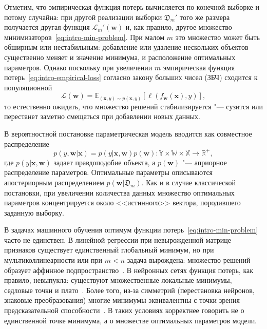 Отметим, что эмпирическая функция потерь вычисляется по конечной выборке и потому случайна: при другой реализации выборки $\mathfrak{D}_m'$ того же размера получается другая функция $\mathcal{L}_m'(\mathbf{w})$ и, как правило, другое множество минимизаторов~\eqref{eq:intro-min-problem}. При малом $m$ это множество может быть обширным или нестабильным: добавление или удаление нескольких объектов существенно меняет и значение минимума, и расположение оптимальных параметров. Однако поскольку при увеличении $m$ эмпирическая функция потерь~\eqref{eq:intro-empirical-loss} согласно закону больших чисел (ЗБЧ) сходится к популяционной
\begin{equation}
    \label{eq:intro-theoretical-loss}
    \mathcal{L}(\mathbf{w}) = \mathbb{E}_{(\mathbf{x}, y) \sim p(\mathbf{x}, y)}[\ell(f_{\mathbf{w}}(\mathbf{x}), y)],
\end{equation}
то естественно ожидать, что множество решений стабилизируется "--- сузится или перестанет заметно смещаться при добавлении новых данных.

В вероятностной постановке параметрическая модель вводится как совместное распределение
\begin{equation}
    \label{eq:intro-probability-problem}
    p(y, \mathbf{w} | \mathbf{x}) = p(y | \mathbf{x}, \mathbf{w}) p(\mathbf{w}): \mathbb{Y} \times \mathbb{W} \times \mathbb{X} \to \mathbb{R}^+,
\end{equation}
где $p(y | \mathbf{x}, \mathbf{w})$ задает правдоподобие объекта, а $p(\mathbf{w})$ "--- априорное распределение параметров. Оптимальные параметры описываются апостериорным распределением 
$p(\mathbf{w}|\mathfrak{D}_m)$. Как и в случае классической постановки, при увеличении количества данных множество оптимальных параметров концентрируется около <<истинного>> вектора, породившего заданную выборку.

В задачах машинного обучения оптимум функции потерь~\eqref{eq:intro-min-problem} часто не единствен. В линейной регрессии при невырожденной матрице признаков существует единственный глобальный минимум, но при мультиколлинеарности или при $m < n$ задача вырождена: множество решений образует аффинное подпространство~\cite{seber2003,strang2006,vorontsov2010dsc}. В нейронных сетях функция потерь, как правило, невыпукла: существуют множественные локальные минимумы, седловые точки и плато~\cite{dauphin2014,choromanska2015,goodfellow2015qualitatively,li2018visualizing}. Более того, из-за симметрий (перестановка нейронов, знаковые преобразования) многие минимумы эквивалентны с точки зрения предсказательной способности~\cite{draxler2018essentially,entezari2022role,ainsworth2023git}. В таких условиях корректнее говорить не о единственной точке минимума, а о множестве оптимальных параметров модели.

